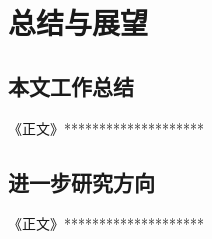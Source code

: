 \chapter{总结与展望}\label{Chap:chap6}

\section{本文工作总结}\label{Sec6.1}
《正文》********************



\section{进一步研究方向}\label{Sec6.2}
《正文》********************




